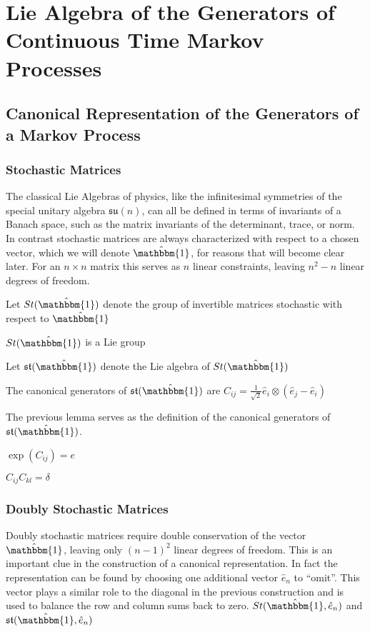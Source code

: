 \chapter{Lie Algebra of the Generators of Continuous Time Markov Processes}
\section{Canonical Representation of the Generators of a Markov Process}
\subsection{Stochastic Matrices}
The classical Lie Algebras of physics, like the infinitesimal symmetries
of the special unitary algebra $\mathfrak{su}(n)$, can all be defined in terms
of invariants of a Banach space, such as the matrix invariants of the 
determinant, trace, or norm. In contrast stochastic matrices are always 
characterized with respect to a chosen vector, which we will denote 
$\hat{\mathbbm{1}}$, for reasons that will become clear later. For an $n \times n$
matrix this serves as $n$ linear constraints, leaving $n^2 - n$ linear degrees of
freedom.
\begin{definition}
	Let $St(\hat{\mathbbm{1}})$ denote the group of invertible matrices stochastic with respect to $\hat{\mathbbm{1}}$
\end{definition}
\begin{lemma}
	$St(\hat{\mathbbm{1}})$ is a Lie group
\end{lemma}
\begin{definition}
	Let $\mathfrak{st}(\hat{\mathbbm{1}})$ denote the Lie algebra of $St(\hat{\mathbbm{1}})$
\end{definition}
\begin{lemma}
	The canonical generators of $\mathfrak{st}(\hat{\mathbbm{1}})$ are $C_{ij} = \frac{1}{\sqrt{2}} \hat{e}_i \otimes \left( \hat{e}_j - \hat{e}_i \right)$
\end{lemma}
The previous lemma serves as the definition of the canonical generators of $\mathfrak{st}(\hat{\mathbbm{1}})$.
\begin{lemma}
	$\exp\left(C_{ij}\right) = e$
\end{lemma}
\begin{lemma}
	$C_{ij}C_{kl} = \delta$
\end{lemma}
\subsection{Doubly Stochastic Matrices}
Doubly stochastic matrices require double conservation of the vector $\hat{\mathbbm{1}}$, leaving
only $\left(n - 1\right)^2$ linear degrees of freedom. This is an important clue in the construction
of a canonical representation. In fact the representation can be found by choosing one additional
vector $\hat{e}_n$ to ``omit''. This vector plays a similar role to the diagonal in the previous
construction and is used to balance the row and column sums back to zero.
$St(\hat{\mathbbm{1}},\hat{e}_n)$ and $\mathfrak{st}(\hat{\mathbbm{1}},\hat{e}_n)$
